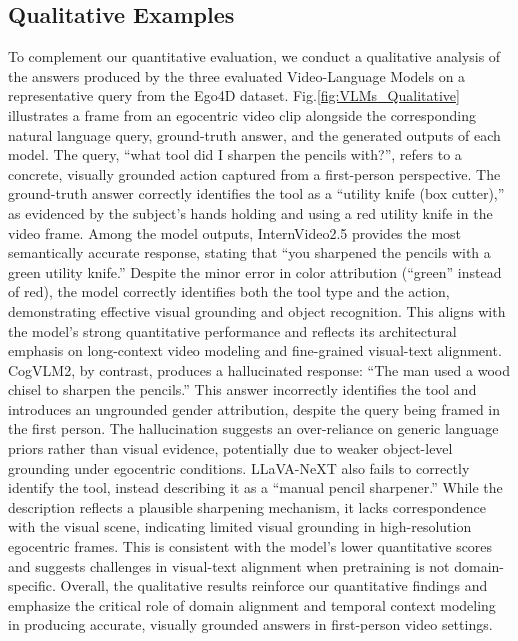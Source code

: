 \documentclass[10pt,twocolumn,letterpaper]{article}
\begin{document}
	
	
	
\subsection{Qualitative Examples}

To complement our quantitative evaluation, we conduct a qualitative analysis of the answers produced by the three evaluated Video-Language Models on a representative query from the Ego4D dataset. Fig.\ref{fig:VLMs_Qualitative} illustrates a frame from an egocentric video clip alongside the corresponding natural language query, ground-truth answer, and the generated outputs of each model.
The query, “what tool did I sharpen the pencils with?”, refers to a concrete, visually grounded action captured from a first-person perspective. The ground-truth answer correctly identifies the tool as a “utility knife (box cutter),” as evidenced by the subject’s hands holding and using a red utility knife in the video frame.
Among the model outputs, InternVideo2.5 provides the most semantically accurate response, stating that “you sharpened the pencils with a green utility knife.” Despite the minor error in color attribution (“green” instead of red), the model correctly identifies both the tool type and the action, demonstrating effective visual grounding and object recognition. This aligns with the model’s strong quantitative performance and reflects its architectural emphasis on long-context video modeling and fine-grained visual-text alignment.
CogVLM2, by contrast, produces a hallucinated response: “The man used a wood chisel to sharpen the pencils.” This answer incorrectly identifies the tool and introduces an ungrounded gender attribution, despite the query being framed in the first person. The hallucination suggests an over-reliance on generic language priors rather than visual evidence, potentially due to weaker object-level grounding under egocentric conditions.
LLaVA-NeXT also fails to correctly identify the tool, instead describing it as a “manual pencil sharpener.” While the description reflects a plausible sharpening mechanism, it lacks correspondence with the visual scene, indicating limited visual grounding in high-resolution egocentric frames. This is consistent with the model’s lower quantitative scores and suggests challenges in visual-text alignment when pretraining is not domain-specific.
Overall, the qualitative results reinforce our quantitative findings and emphasize the critical role of domain alignment and temporal context modeling in producing accurate, visually grounded answers in first-person video settings.
\end{document}
